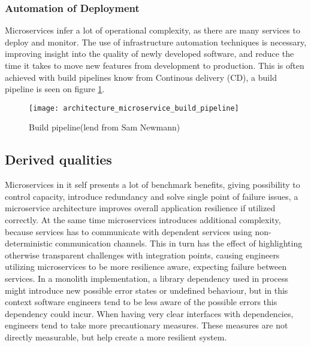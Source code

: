 
\subsubsection*{Automation of Deployment}
Microservices infer a lot of operational complexity, as there are many services to deploy and monitor. The use of infrastructure automation techniques is necessary, improving insight into the quality of newly developed software, and reduce the time it takes to move new features from development to production\cite{newman2015microservices}. This is often achieved with build pipelines know from Continous delivery (CD), a build pipeline is seen on figure \ref{fig:architecture_microservice_build_pipeline}.

\begin{figure}[!htb]
  \texttt{[image: architecture\_microservice\_build\_pipeline]}  
  \caption{Build pipeline(lend from Sam Newmann)}
  \label{fig:architecture_microservice_build_pipeline}
\end{figure}


\subsection{Derived qualities}
Microservices in it self presents a lot of benchmark benefits, giving possibility to control capacity, introduce redundancy and solve single point of failure issues, a microservice architecture improves overall application resilience if utilized correctly. At the same time microservices introduces additional complexity, because services has to communicate with dependent services using non-deterministic communication channels. This in turn has the effect of highlighting otherwise transparent challenges with integration points, causing engineers utilizing microservices to be more resilience aware, expecting failure between services. In a monolith implementation, a library dependency used in process might introduce new possible error states or undefined behaviour, but in this context software engineers tend to be less aware of the possible errors this dependency could incur. When having very clear interfaces with dependencies, engineers tend to take more precautionary measures. These measures are not directly measurable, but help create a more resilient system. 

